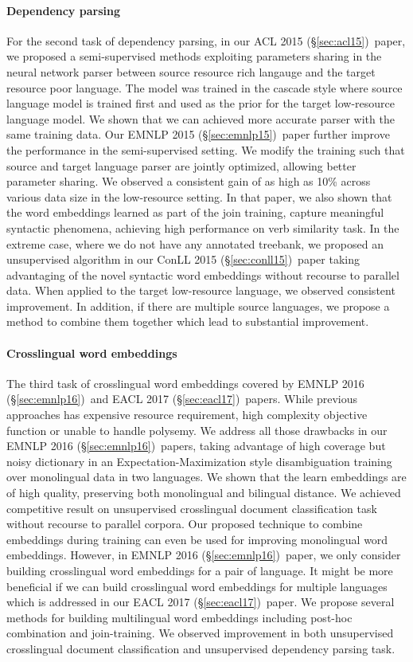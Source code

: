 \documentclass[12pt,twoside,final,hidelinks]{ltthesis}
\theoremstyle{definition}
\newcommand\conllv{ConLL 2015 (\S\ref{sec:conll15})}
\newcommand\aclv{ACL 2015 (\S\ref{sec:acl15})}
\newcommand\emnlpv{EMNLP 2015 (\S\ref{sec:emnlp15})}
\newcommand\emnlpvi{EMNLP 2016 (\S\ref{sec:emnlp16})}
\newcommand\eaclvii{EACL 2017 (\S\ref{sec:eacl17})}
\begin{document}
\paragraph{Dependency parsing} For the second task of dependency parsing, in our \aclv\ paper, we proposed a semi-supervised methods exploiting parameters sharing in the 
neural network parser between source resource rich langauge and the target resource poor language. The model was trained in the cascade style 
where source language model is trained first and used as the prior for the target low-resource language model. We shown that we can achieved 
more accurate parser with the same training data. Our \emnlpv\ paper further improve the performance in the semi-supervised setting. We modify 
the training such that source and target language parser are jointly optimized, allowing better parameter sharing. We observed a consistent gain
of as high as 10\% across various data size in the low-resource setting. In that paper, we also shown that the word embeddings learned as part 
of the join training, capture meaningful syntactic phenomena, achieving high performance on verb similarity task. In the extreme case, where 
we do not have any annotated treebank, we proposed an unsupervised algorithm in our \conllv\ paper taking advantaging of the novel syntactic word 
embeddings without recourse to parallel data. When applied to the target low-resource language, we observed consistent improvement. In addition, 
if there are multiple source languages, we propose a method to combine them together which lead to substantial improvement. 

\paragraph{Crosslingual word embeddings}The third task of crosslingual word embeddings covered by \emnlpvi\ and \eaclvii\ papers. While previous approaches has expensive resource requirement, 
high complexity objective function or unable to handle polysemy. We address all those drawbacks in our \emnlpvi\ papers, taking advantage of high 
coverage but noisy dictionary in an Expectation-Maximization style disambiguation training over monolingual data in two languages. We shown that the 
learn embeddings are of high quality, preserving both monolingual and bilingual distance. We achieved competitive result on unsupervised crosslingual 
document classification task without recourse to parallel corpora. Our proposed technique to combine embeddings during training can even be used for 
improving monolingual word embeddings. However, in \emnlpvi\ paper, we only consider building crosslingual word embeddings for a pair of language. 
It might be more beneficial if we can build crosslingual word embeddings for multiple languages which is addressed in our \eaclvii\ paper. We propose
several methods for building multilingual word embeddings including post-hoc combination and join-training. We observed improvement in both unsupervised 
crosslingual document classification and unsupervised dependency parsing task. 
\end{document}
